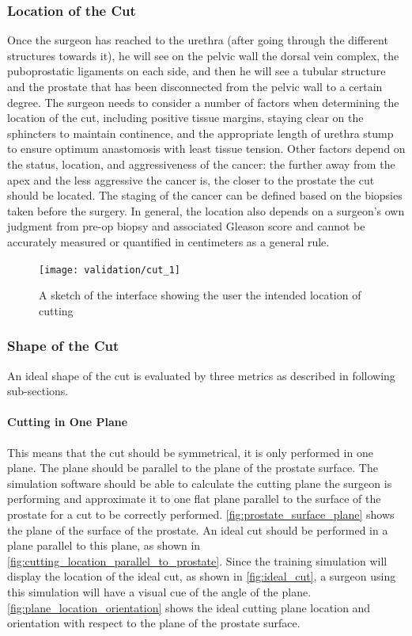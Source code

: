 \subsubsection{Location of the Cut}
Once the surgeon has reached to the urethra (after going through the different structures towards it), he will see on the pelvic wall the dorsal vein complex, the puboprostatic ligaments on each side, and then he will see a tubular structure and the prostate that has been disconnected from the pelvic wall to a certain degree. The surgeon needs to consider a number of factors when determining the location of the cut, including positive tissue margins, staying clear on the sphincters to maintain continence, and the appropriate length of urethra stump to ensure optimum anastomosis with least tissue tension. Other factors depend on the status, location, and aggressiveness of the cancer: the further away from the apex and the less aggressive the cancer is, the closer to the prostate the cut should be located. The staging of the cancer can be defined based on the biopsies taken before the surgery. In general, the location also depends on a surgeon's own judgment from pre-op biopsy and associated Gleason score and cannot be accurately measured or quantified in centimeters as a general rule.

\begin{figure}
  \centering%
  \texttt{[image: validation/cut\_1]}
  \caption{A sketch of the interface showing the user the intended location of cutting}\label{fig:ideal_cut}
\end{figure}

\subsubsection{Shape of the Cut}
An ideal shape of the cut is evaluated by three  metrics as described in following sub-sections.

\paragraph{Cutting in One Plane}\label{par:metric_1}
This means that the cut should be symmetrical, \ie it is only performed in one plane. The plane should be parallel to the plane of the prostate surface. The simulation software should be able to calculate the cutting plane the surgeon is performing and approximate it to one flat plane parallel to the surface of the prostate for a cut to be correctly performed.
\autoref{fig:prostate_surface_plane} shows the plane of the surface of the prostate. An ideal cut should be performed in a plane parallel to this plane, as shown in \autoref{fig:cutting_location_parallel_to_prostate}. Since the training simulation will display the location of the ideal cut, as shown in \autoref{fig:ideal_cut}, a surgeon using this simulation will have a visual cue of the angle of the plane. \autoref{fig:plane_location_orientation} shows the ideal cutting plane location and orientation with respect to the plane of the prostate surface.

